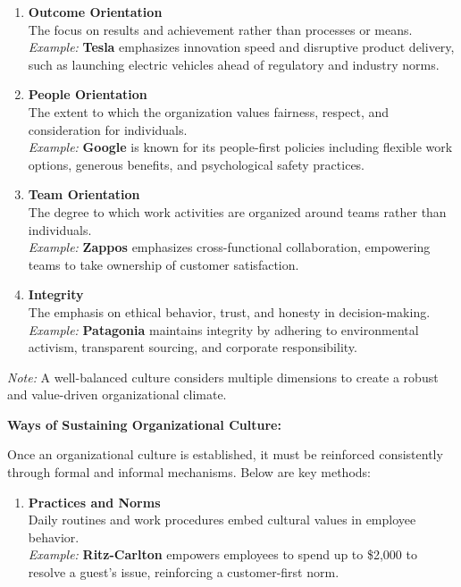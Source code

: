 \documentclass[10pt,a4paper]{book}
\begin{document}
\begin{multicols}{2}
\begin{enumerate}
    \item \textbf{Outcome Orientation} \\
    The focus on results and achievement rather than processes or means. \\
    \textit{Example:} \textbf{Tesla} emphasizes innovation speed and disruptive product delivery, such as launching electric vehicles ahead of regulatory and industry norms.

    \item \textbf{People Orientation} \\
    The extent to which the organization values fairness, respect, and consideration for individuals. \\
    \textit{Example:} \textbf{Google} is known for its people-first policies including flexible work options, generous benefits, and psychological safety practices.

    \item \textbf{Team Orientation} \\
    The degree to which work activities are organized around teams rather than individuals. \\
    \textit{Example:} \textbf{Zappos} emphasizes cross-functional collaboration, empowering teams to take ownership of customer satisfaction.

    \item \textbf{Integrity} \\
    The emphasis on ethical behavior, trust, and honesty in decision-making. \\
    \textit{Example:} \textbf{Patagonia} maintains integrity by adhering to environmental activism, transparent sourcing, and corporate responsibility.
\end{enumerate}

\textit{Note:} A well-balanced culture considers multiple dimensions to create a robust and value-driven organizational climate.

\vspace{0.5cm}

\textbf{Ways of Sustaining Organizational Culture:}

Once an organizational culture is established, it must be reinforced consistently through formal and informal mechanisms. Below are key methods:

\begin{enumerate}
    \item \textbf{Practices and Norms} \\
    Daily routines and work procedures embed cultural values in employee behavior. \\
    \textit{Example:} \textbf{Ritz-Carlton} empowers employees to spend up to \$2,000 to resolve a guest’s issue, reinforcing a customer-first norm.


\end{enumerate}
\end{multicols}
\end{document}
